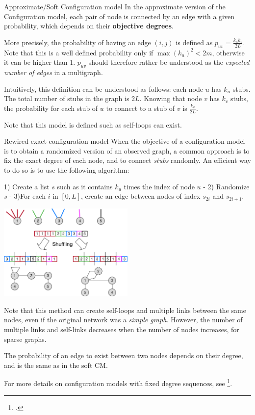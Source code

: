 \documentclass[a4paper,11pt]{book}
\begin{document}
\begin{textbox}{Approximate/Soft Configuration model}
In the approximate version of the Configuration model, each pair of node is connected by an edge with a given probability, which depends on their \textbf{objective degrees}. 

More precisely, the probability of having an edge $(i,j)$ is defined as $p_{uv}= \frac{k_u k_v}{2L}$. Note that this is a well defined probability only if $\max(k_u)^2 < 2m$, otherwise it can be higher than 1. $p_{uv}$ should therefore rather be understood as the \textit{expected number of edges} in a multigraph.

Intuitively, this definition can be understood as follows: each node $u$ has $k_u$ stubs. The total number of stubs in the graph is $2L$. Knowing that node $v$ has $k_v$ stubs, the probability for each stub of $u$ to connect to a stub of $v$ is $\frac{k_v}{2L}$.

Note that this model is defined such as self-loops can exist.

\end{textbox}









\begin{textbox}{Rewired exact configuration model}
When the objective of a configuration model is to obtain a randomized version of an observed graph, a common approach is to fix the exact degree of each node, and to connect \textit{stubs} randomly. An efficient way to do so is to use the following algorithm:

1) Create a list $s$ such as it contains $k_u$ times the index of node $u$ -  2) Randomize $s$ -      3)For each $i$ in $[0,L]$, create an edge between nodes of index $s_{2i}$ and $s_{2i+1}$.

\begin{center}
\includegraphics[width=0.5\textwidth]{pics/dynamic/configuration.pdf}
\end{center}

Note that this method can create self-loops and multiple links between the same nodes, even if the original network was a \textit{simple graph}. However, the number of multiple links and self-links decreases when the number of nodes increases, for sparse graphs.

The probability of an edge to exist between two nodes depends on their degree, and is the same as in the soft CM.

For more details on configuration models with fixed degree sequences, see \footcite{fosdick2018configuring}.
\end{textbox}
\end{document}
